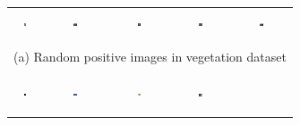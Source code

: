 \begin{figure}[th]
{\tiny{
\begin{center}
\begin{tabular}{@{}c@{\,\,\,}c@{\,\,\,}c@{\,\,\,}c@{\,\,\,}c@{\,\,\,}}
\includegraphics[width=0.06\textwidth, height=0.35in]{imggrid/datasetposi/6.jpg} &
\includegraphics[width=0.06\textwidth, height=0.35in]{imggrid/datasetposi/7.jpg} &
\includegraphics[width=0.06\textwidth, height=0.35in]{imggrid/datasetposi/8.jpg} &
\includegraphics[width=0.06\textwidth, height=0.35in]{imggrid/datasetposi/9.jpg} &
\includegraphics[width=0.06\textwidth, height=0.35in]{imggrid/datasetposi/10.jpg} \\
\multicolumn{5}{c}{(a) Random positive images in vegetation dataset} \\ 
\\[1pt]
\hline
\\[1pt]
\includegraphics[width=0.06\textwidth, height=0.35in]{imggrid/datasetnega/6.jpg} &
\includegraphics[width=0.06\textwidth, height=0.35in]{imggrid/datasetnega/7.jpg} &
\includegraphics[width=0.06\textwidth, height=0.35in]{imggrid/datasetnega/8.jpg} &
\includegraphics[width=0.06\textwidth, height=0.35in]{imggrid/datasetnega/9.jpg} &

\end{tabular}
\end{center}}}
\end{figure}
